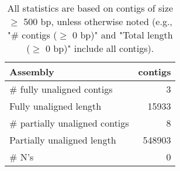 \documentclass[12pt,a4paper]{article}
\begin{document}
\begin{table}[ht]
\begin{center}
\caption{All statistics are based on contigs of size $\geq$ 500 bp, unless otherwise noted (e.g., "\# contigs ($\geq$ 0 bp)" and "Total length ($\geq$ 0 bp)" include all contigs).}
\begin{tabular}{|l*{1}{|r}|}
\hline
Assembly & contigs \\ \hline
\# fully unaligned contigs & 3 \\ \hline
Fully unaligned length & 15933 \\ \hline
\# partially unaligned contigs & 8 \\ \hline
Partially unaligned length & 548903 \\ \hline
\# N's & 0 \\ \hline
\end{tabular}
\end{center}
\end{table}
\end{document}
